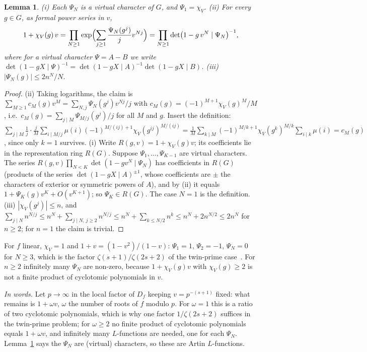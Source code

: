 \documentclass[11pt,a4paper]{article}
\newtheorem{lemma}[theorem]{Lemma}
\theoremstyle{remark}\newtheorem{remark}[theorem]{Remark}
\begin{document}
\begin{lemma}\label{lem:psi}
(i) Each $\Psi_N$ is a virtual character of $G$, and $\Psi_1=\chi_V$.
(ii) For every $g\in G$, as formal power series in $v$,
\[
1+\chi_V(g)\,v=\prod_{N\ge1}\exp\Bigl(\sum_{j\ge1}\frac{\Psi_N(g^j)}{j}v^{Nj}\Bigr)
=\prod_{N\ge1}\det\bigl(1-g\,v^N\mid\Psi_N\bigr)^{-1},
\]
where for a virtual character $\Psi=A-B$ we write $\det(1-gX\mid\Psi)^{-1}=\det(1-gX\mid A)^{-1}\det(1-gX\mid B)$.
(iii) $|\Psi_N(g)|\le 2n^N/N$.
\end{lemma}
\begin{proof}
(ii) Taking logarithms, the claim is $\sum_{M\ge1}c_M(g)v^M=\sum_{N,j}\Psi_N(g^j)v^{Nj}/j$ with
$c_M(g)=(-1)^{M+1}\chi_V(g)^M/M$, i.e.\ $c_M(g)=\sum_{j\mid M}\Psi_{M/j}(g^j)/j$ for all $M$ and $g$. Insert the
definition: $\sum_{j\mid M}\frac1j\cdot\frac{j}{M}\sum_{i\mid M/j}\mu(i)(-1)^{M/(ij)+1}\chi_V(g^{ij})^{M/(ij)}
=\frac1M\sum_{k\mid M}(-1)^{M/k+1}\chi_V(g^k)^{M/k}\sum_{i\mid k}\mu(i)=c_M(g)$, since only $k=1$ survives.
(i) Write $R(g,v)=1+\chi_V(g)v$; its coefficients lie in the representation ring $R(G)$. Suppose
$\Psi_1,\dots,\Psi_{K-1}$ are virtual characters. The series
$R(g,v)\prod_{N<K}\det(1-gv^N\mid\Psi_N)$ has coefficients in $R(G)$ (products of the series
$\det(1-gX\mid A)^{\pm1}$, whose coefficients are $\pm$ the characters of exterior or symmetric powers of
$A$), and by (ii) it equals $1+\Psi_K(g)v^K+O(v^{K+1})$; so $\Psi_K\in R(G)$. The case $N=1$ is the
definition. (iii) $|\chi_V(g^j)|\le n$, and $\sum_{j\mid N}n^{N/j}\le n^N+\sum_{j\mid N,\,j\ge2}n^{N/j}\le n^N+\sum_{k\le N/2}n^k\le n^N+2n^{N/2}\le2n^N$ for $n\ge2$; for $n=1$ the claim is trivial.
\end{proof}

For $f$ linear, $\chi_V=1$ and $1+v=(1-v^2)/(1-v)$: $\Psi_1=1$, $\Psi_2=-1$, $\Psi_N=0$ for $N\ge3$, which is
the factor $\zeta(s+1)/\zeta(2s+2)$ of the twin-prime case~\cite{GoldstonSuriajaya2021}. For $n\ge2$
infinitely many $\Psi_N$ are non-zero, because $1+\chi_V(g)v$ with $\chi_V(g)\ge2$ is not a finite product
of cyclotomic polynomials in $v$.

\emph{In words.} Let $p\to\infty$ in the local factor of $D_f$ keeping $v=p^{-(s+1)}$ fixed: what remains is
$1+\omega v$, $\omega$ the number of roots of $f$ modulo $p$. For $\omega=1$ this is a ratio of two cyclotomic
polynomials, which is why one factor $1/\zeta(2s+2)$ suffices in the twin-prime problem; for $\omega\ge2$ no
finite product of cyclotomic polynomials equals $1+\omega v$, and infinitely many $L$-functions are needed,
one for each $\Psi_N$. Lemma~\ref{lem:psi} says the $\Psi_N$ are (virtual) characters, so these are Artin
$L$-functions.
\end{document}
